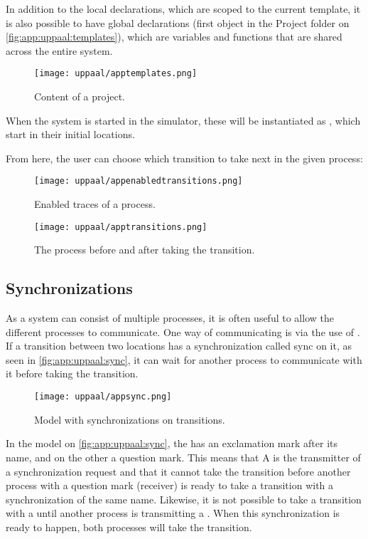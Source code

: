 In addition to the local declarations, which are scoped to the current template, it is also possible to have global declarations (first object in the Project folder on \autoref{fig:app:uppaal:templates}), which are variables and functions that are shared across the entire system.

\begin{figure}[H]
    \centering
    \texttt{[image: uppaal/apptemplates.png]}
    \caption{Content of a \uppaal project.}
    \label{fig:app:uppaal:templates}
\end{figure}
\noindent
When the system is started in the simulator, these  will be instantiated as , which start in their initial locations.

From here, the user can choose which transition to take next in the given process:

\begin{figure}[H]
    \centering
    \texttt{[image: uppaal/appenabledtransitions.png]}
    \caption{Enabled traces of a process.}
    \label{fig:app:uppaal:enabledtransitions}
\end{figure}

\begin{figure}[H]
    \centering
    \texttt{[image: uppaal/apptransitions.png]}
    \caption{The process before and after taking the transition.}
    \label{fig:app:uppaal:transitions}
\end{figure}

\subsection{Synchronizations}
As a \uppaal system can consist of multiple processes, it is often useful to allow the different processes to communicate.
One way of communicating is via the use of .
If a transition between two locations has a synchronization called sync on it, as seen in \autoref{fig:app:uppaal:sync}, it can wait for another process to communicate with it before taking the transition.

\begin{figure}[H]
    \centering
    \texttt{[image: uppaal/appsync.png]}
    \caption{Model with synchronizations on transitions.}
    \label{fig:app:uppaal:sync}
\end{figure}
\noindent
In the model on \autoref{fig:app:uppaal:sync}, the  has an exclamation mark after its name, and on the other a question mark.
This means that A is the transmitter of a synchronization request and that it cannot take the transition before another process with a question mark (receiver) is ready to take a transition with a synchronization of the same name.
Likewise, it is not possible to take a transition with a  until another process is transmitting a .
When this synchronization is ready to happen, both processes will take the transition.

